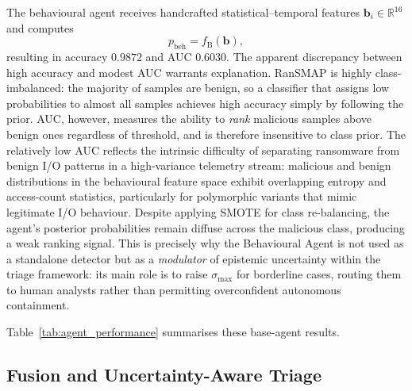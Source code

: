 \documentclass[lettersize,journal]{IEEEtran}
\begin{document}
The behavioural agent receives handcrafted statistical–temporal features \(\mathbf{b}_i \in \mathbb{R}^{16}\) and computes
\begin{equation}
p_{\mathrm{beh}} = f_{\mathrm{B}}(\mathbf{b}),
\label{eq:pbeh}
\end{equation}
resulting in accuracy \(0.9872\) and AUC \(0.6030\). The apparent discrepancy between high
accuracy and modest AUC warrants explanation. RanSMAP is highly class-imbalanced: the majority
of samples are benign, so a classifier that assigns low probabilities to almost all samples
achieves high accuracy simply by following the prior. AUC, however, measures the ability to
\emph{rank} malicious samples above benign ones regardless of threshold, and is therefore
insensitive to class prior. The relatively low AUC reflects the intrinsic difficulty of
separating ransomware from benign I/O patterns in a high-variance telemetry stream: malicious
and benign distributions in the behavioural feature space exhibit overlapping entropy and
access-count statistics, particularly for polymorphic variants that mimic legitimate I/O
behaviour. Despite applying SMOTE for class re-balancing, the agent's posterior probabilities
remain diffuse across the malicious class, producing a weak ranking signal. This is precisely
why the Behavioural Agent is not used as a standalone detector but as a \emph{modulator} of
epistemic uncertainty within the triage framework: its main role is to raise $\sigma_{\max}$
for borderline cases, routing them to human analysts rather than permitting overconfident
autonomous containment.

Table~\ref{tab:agent_performance} summarises these base-agent results.

\begin{table}[ht]
\centering
{}
\caption{Performance of the individual agents prior to fusion.}
\label{tab:agent_performance}
\end{table}

\subsection{Fusion and Uncertainty-Aware Triage}
\end{document}
